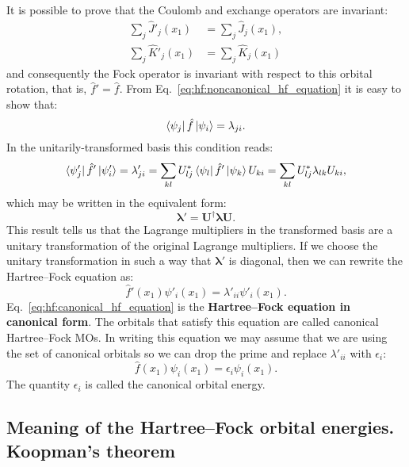 \documentclass[../Main/chem532-notes.tex]{subfiles}
\begin{document}
It is possible to prove that the Coulomb and exchange operators are invariant:
\begin{align}
\sum_j \hat{J}'_j(x_1) &= \sum_j \hat{J}_j(x_1), \\
\sum_j \hat{K}'_j(x_1) &= \sum_j \hat{K}_j(x_1)
\end{align}
and consequently the Fock operator is invariant with respect to this orbital rotation, that is, $\hat{f}' = \hat{f}$. 
From Eq.~\eqref{eq:hf:noncanonical_hf_equation} it is easy to show that:
\begin{equation}
\bra{\psi_j} \hat{f} \ket{\psi_i} = \lambda_{ji}.
\end{equation}
In the unitarily-transformed basis this condition reads:
\begin{equation}
\bra{\psi'_j} \hat{f}' \ket{\psi'_i} = \lambda'_{ji} = \sum_{kl} U_{lj}^* \bra{\psi_l} \hat{f}' \ket{\psi_k} U_{ki}
= \sum_{kl} U_{lj}^* \lambda_{lk} U_{ki},
\end{equation}
which may be written in the equivalent form:
\begin{equation}
\boldsymbol\lambda' = \mathbf{U}^{\dagger} \boldsymbol\lambda \mathbf{U}.
\end{equation}
This result tells us that the Lagrange multipliers in the transformed basis are a unitary transformation of the original Lagrange multipliers.
If we choose the unitary transformation in such a way that $\boldsymbol\lambda'$ is diagonal, then we can rewrite the Hartree--Fock equation as:
 \begin{equation} \label{eq:hf:canonical_hf_equation}
\hat{f}'(x_1)  \psi'_{i}(x_1) 
= \lambda'_{ii} \psi'_{i}(x_1).
\end{equation}
Eq.~\eqref{eq:hf:canonical_hf_equation} is the \textbf{Hartree--Fock equation in canonical form}.
The orbitals that satisfy this equation are called canonical Hartree--Fock MOs.
In writing this equation we may assume that we are using the set of canonical orbitals so we can drop the prime and replace $\lambda'_{ii}$ with $\epsilon_{i}$:
\begin{equation} \label{eq:hf:canonical_hf_equation2}
\hat{f}(x_1)  \psi_{i}(x_1) 
= \epsilon_{i} \psi_{i}(x_1).
\end{equation}
The quantity $\epsilon_{i}$ is called the canonical orbital energy.

\subsection{Meaning of the Hartree--Fock orbital energies. Koopman's theorem}
\end{document}
